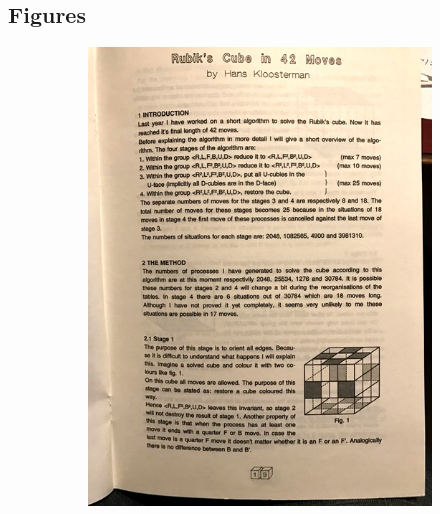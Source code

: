 \documentclass{report}
\begin{document}
\begin{appendices}
		\chapter{Figures}
		\begin{figure}[H]
			\centering
			\begin{subfigure}[b]{0.45\textwidth}
				\includegraphics[width=\textwidth]{Resources/Images/appKloosterman1.jpg}
			\end{subfigure}
			\hspace{5mm}
			\begin{subfigure}[b]{0.45\textwidth}

\end{subfigure}
\end{figure}
\end{appendices}
\end{document}
